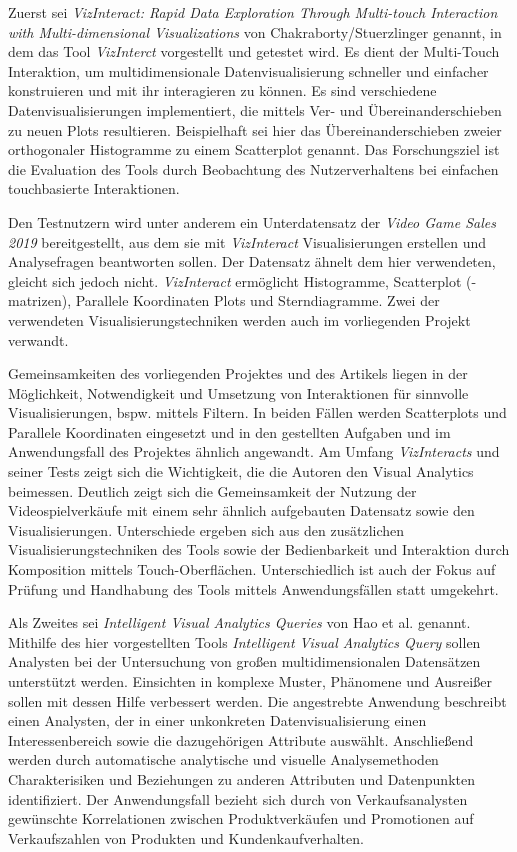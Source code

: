 \documentclass[usegeometry=true]{scrartcl}
\begin{document}
Zuerst sei \textit{VizInteract: Rapid Data Exploration Through Multi-touch Interaction with Multi-dimensional Visualizations} von Chakraborty/Stuerzlinger genannt, 
in dem das Tool \textit{VizInterct} vorgestellt und getestet wird.\cite{Chakraborty.2021}
Es dient der Multi-Touch Interaktion, um multidimensionale Datenvisualisierung schneller und einfacher konstruieren und mit ihr interagieren zu können.
Es sind verschiedene Datenvisualisierungen implementiert, die mittels Ver- und Übereinanderschieben zu neuen Plots resultieren.
Beispielhaft sei hier das Übereinanderschieben zweier orthogonaler Histogramme zu einem Scatterplot genannt. 
Das Forschungsziel ist die Evaluation des Tools durch Beobachtung des Nutzerverhaltens bei einfachen touchbasierte Interaktionen.

Den Testnutzern wird unter anderem ein Unterdatensatz der \textit{Video Game Sales 2019} bereitgestellt, 
aus dem sie mit \textit{VizInteract} Visualisierungen erstellen und Analysefragen beantworten sollen.
Der Datensatz ähnelt dem hier verwendeten, gleicht sich jedoch nicht. 
\textit{VizInteract} ermöglicht Histogramme, Scatterplot (-matrizen), Parallele Koordinaten Plots und Sterndiagramme. 
Zwei der verwendeten Visualisierungstechniken werden auch im vorliegenden Projekt verwandt. 

Gemeinsamkeiten des vorliegenden Projektes und des Artikels liegen in der Möglichkeit, Notwendigkeit und 
Umsetzung von Interaktionen für sinnvolle Visualisierungen, bspw. mittels Filtern.
In beiden Fällen werden Scatterplots und Parallele Koordinaten eingesetzt und in den gestellten Aufgaben und 
im Anwendungsfall des Projektes ähnlich angewandt. 
Am Umfang \textit{VizInteracts} und seiner Tests zeigt sich die Wichtigkeit, die die Autoren den Visual Analytics beimessen.
Deutlich zeigt sich die Gemeinsamkeit der Nutzung der Videospielverkäufe mit einem sehr ähnlich aufgebauten Datensatz sowie den Visualisierungen.
Unterschiede ergeben sich aus den zusätzlichen Visualisierungstechniken des Tools sowie der Bedienbarkeit und Interaktion durch Komposition mittels Touch-Oberflächen. 
Unterschiedlich ist auch der Fokus auf Prüfung und Handhabung des Tools mittels Anwendungsfällen statt umgekehrt.

Als Zweites sei \textit{Intelligent Visual Analytics Queries} von Hao et al. genannt.\cite{Hao.2007}
Mithilfe des hier vorgestellten Tools \textit{Intelligent Visual Analytics Query} sollen Analysten bei der Untersuchung 
von großen multidimensionalen Datensätzen unterstützt werden.
Einsichten in komplexe Muster, Phänomene und Ausreißer sollen mit dessen Hilfe verbessert werden.
Die angestrebte Anwendung beschreibt einen Analysten, der in einer unkonkreten Datenvisualisierung einen Interessenbereich 
sowie die dazugehörigen Attribute auswählt.
Anschließend werden durch automatische analytische und visuelle Analysemethoden Charakterisiken und Beziehungen 
zu anderen Attributen und Datenpunkten identifiziert.
Der Anwendungsfall bezieht sich durch von Verkaufsanalysten gewünschte Korrelationen zwischen Produktverkäufen und Promotionen 
auf Verkaufszahlen von Produkten und Kundenkaufverhalten.
\end{document}
